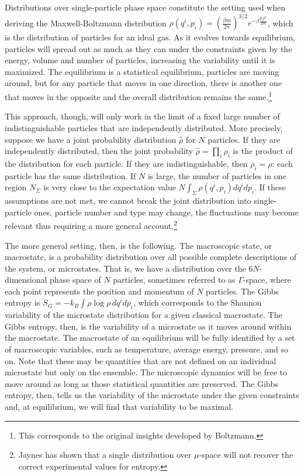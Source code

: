 \documentclass[iopart]{revtex4-1}
\begin{document}
Distributions over single-particle phase space constitute the setting used when deriving the Maxwell-Boltzmann distribution $\rho(q^i, p_i) = \left(\frac{\beta m}{2\pi} \right)^{3/2}e^{-\beta \frac{p_ip^i}{2m}}$, which is the distribution of particles for an ideal gas. As it evolves towards equilibrium, particles will spread out as much as they can under the constraints given by the energy, volume and number of particles, increasing the variability until it is maximized. The equilibrium is a statistical equilibrium, particles are moving around, but for any particle that moves in one direction, there is another one that moves in the opposite and the overall distribution remains the same.\footnote{This corresponds to the original insights developed by Boltzmann.}

This approach, though, will only work in the limit of a fixed large number of indistinguishable particles that are independently distributed. More precisely, suppose we have a joint probability distribution $\hat{\rho}$ for $N$ particles. If they are independently distributed, then the joint probability $\hat{\rho}=\prod_{i}\rho_i$ is the product of the distribution for each particle. If they are indistinguishable, then $\rho_i=\rho$: each particle has the same distribution. If $N$ is large, the number of particles in one region $N_\Sigma$ is very close to the expectation value $N\int_\Sigma \rho(q^i, p_i)dq^idp_i$. If these assumptions are not met, we cannot break the joint distribution into single-particle ones, particle number and type may change, the fluctuations may become relevant thus requiring a more general account.\footnote{Jaynes\cite{Jaynes} has shown that a single distribution over $\mu$-space will not recover the correct experimental values for entropy.}

The more general setting, then, is the following. The macroscopic state, or macrostate, is a probability distribution over all possible complete descriptions of the system, or microstates. That is, we have a distribution over the $6N$-dimensional phase space of $N$ particles, sometimes referred to as $\Gamma$-space, where each point represents the position and momentum of $N$ particles. The Gibbs entropy is $S_G = -k_B \int \rho \log \rho \, dq^idp_i$, which corresponds to the Shannon variability of the microstate distribution for a given classical macrostate. The Gibbs entropy, then, is the variability of a microstate as it moves around within the macrostate. The macrostate of an equilibrium will be fully identified by a set of macroscopic variables, such as temperature, average energy, pressure, and so on. Note that these may be quantities that are not defined on an individual microstate but only on the ensemble. The microscopic dynamics will be free to move around as long as those statistical quantities are preserved. The Gibbs entropy, then, tells us the variability of the microstate under the given constraints and, at equilibrium, we will find that variability to be maximal.
\end{document}
